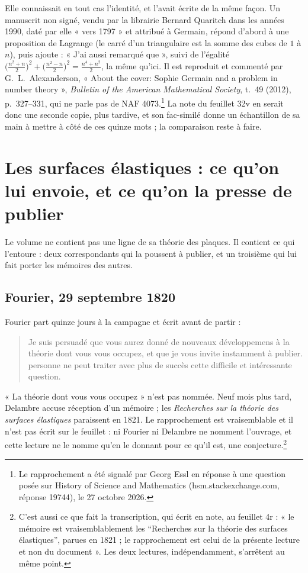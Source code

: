 \documentclass[11pt,a4paper]{article}
\begin{document}
Elle connaissait en tout cas l'identité, et l'avait écrite de la même façon.
Un manuscrit non signé, vendu par la librairie Bernard Quaritch dans les
années 1990, daté par elle « vers 1797 » et attribué à Germain, répond d'abord
à une proposition de Lagrange (le carré d'un triangulaire est la somme des
cubes de $1$ à $n$), puis ajoute : « J'ai aussi remarqué que », suivi de
l'égalité $\big(\tfrac{n^2+n}{2}\big)^2 + \big(\tfrac{n^2-n}{2}\big)^2 =
\tfrac{n^4+n^2}{2}$, la même qu'ici. Il est reproduit et commenté par
G.~L.~Alexanderson, « About the cover: Sophie Germain and a problem in number
theory », \emph{Bulletin of the American Mathematical Society}, t.~49 (2012),
p.~327--331, qui ne parle pas de NAF 4073.\footnote{Le rapprochement a été
signalé par Georg Essl en réponse à une question posée sur History of Science
and Mathematics (hsm.stackexchange.com, réponse 19744), le 27 octobre 2026.}
La note du feuillet 32v en serait donc une seconde copie, plus tardive, et son
fac-similé donne un échantillon de sa main à mettre à côté de ces quinze mots ;
la comparaison reste à faire.

\section*{Les surfaces élastiques : ce qu'on lui envoie, et ce qu'on la presse de publier}

Le volume ne contient pas une ligne de sa théorie des plaques. Il contient ce
qui l'entoure : deux correspondants qui la poussent à publier, et un troisième
qui lui fait porter les mémoires des autres.

\subsection*{Fourier, 29 septembre 1820}

Fourier part quinze jours à la campagne et écrit avant de partir :
\begin{quote}
Je suis persuadé que vous aurez donné de nouveaux développemens à la théorie
dont vous vous occupez, et que je vous invite instamment à publier. personne
ne peut traiter avec plus de succès cette difficile et intéressante question.
\end{quote}
« La théorie dont vous vous occupez » n'est pas nommée. Neuf mois plus tard,
Delambre accuse réception d'un mémoire ; les \emph{Recherches sur la théorie
des surfaces élastiques} paraissent en 1821. Le rapprochement est
vraisemblable et il n'est pas écrit sur le feuillet : ni Fourier ni Delambre ne
nomment l'ouvrage, et cette lecture ne le nomme qu'en le donnant pour ce qu'il
est, une conjecture.\footnote{C'est aussi ce que fait la transcription, qui
écrit en note, au feuillet 4r : « le mémoire est vraisemblablement les
“Recherches sur la théorie des surfaces élastiques”, parues en 1821 ; le
rapprochement est celui de la présente lecture et non du document ». Les deux
lectures, indépendamment, s'arrêtent au même point.}
\end{document}
